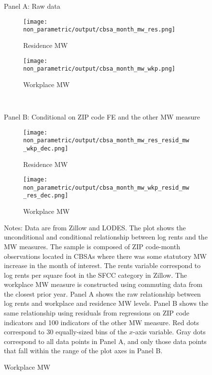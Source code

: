 \begin{figure}[h!]
    \centering
    \caption{Relationship between log rents and the minimum wage measures, 
             sample of affected ZIP code-months}
    \label{fig:non_parametric}
    
    \begin{minipage}{.95\textwidth} \centering
        Panel A: Raw data
        \vspace{1mm}
    \end{minipage}
    \begin{subfigure}{0.5\textwidth}
        \caption*{Residence MW}
        \texttt{[image: non\_parametric/output/cbsa\_month\_mw\_res.png]}
    \end{subfigure}%
    \begin{subfigure}{0.5\textwidth}
        \caption*{Workplace MW}
        \texttt{[image: non\_parametric/output/cbsa\_month\_mw\_wkp.png]}
    \end{subfigure}\\

    \vspace{2mm}
    \begin{minipage}{.95\textwidth} \centering
        Panel B: Conditional on ZIP code FE and the other MW measure
        \vspace{1mm}
    \end{minipage}
    \begin{subfigure}{0.5\textwidth}
        \caption*{Residence MW}
        \texttt{[image: non\_parametric/output/cbsa\_month\_mw\_res\_resid\_mw\_wkp\_dec.png]}
    \end{subfigure}%
    \begin{subfigure}{0.5\textwidth}
        \caption*{Workplace MW}
        \texttt{[image: non\_parametric/output/cbsa\_month\_mw\_wkp\_resid\_mw\_res\_dec.png]}
    \end{subfigure}

    \begin{minipage}{.95\textwidth} \footnotesize
        \vspace{3mm}
        Notes:
        Data are from Zillow and LODES.
        The plot shows the unconditional and conditional relationship between 
        log rents and the MW measures.
        The sample is composed of ZIP code-month observations located in CBSAs 
        where there was some statutory MW increase in the month of interest. 
        The rents variable correspond to log rents per square foot in the SFCC 
        category in Zillow.
        The workplace MW measure is constructed using commuting data from the 
        closest prior year.
        Panel A shows the raw relationship between log rents and workplace 
        and residence MW levels.
        Panel B shows the same relationship using residuals from regressions 
        on ZIP code indicators and 100 indicators of the other MW measure.
        Red dots correspond to 30 equally-sized bins of the $x$-axis variable.
        Gray dots correspond to all data points in Panel A, and only those 
        data points that fall within the range of the plot axes in Panel B.
    \end{minipage}
\end{figure}
